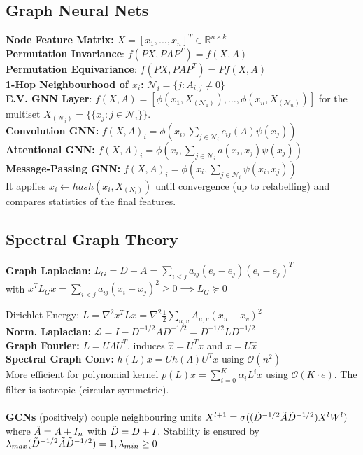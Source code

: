 \subsection*{Graph Neural Nets}
\textbf{Node Feature Matrix:} $X = [x_1, ..., x_n]^T \in \mathbb{R}^{n\times k}$\\
\textbf{Permutation Invariance}: $f(PX, PAP^T) = f(X, A)$\\
\textbf{Permutation Equivariance}: $f(PX, PAP^T) = Pf(X, A)$\\
\textbf{1-Hop Neighbourhood of $x_i$:} $\mathcal{N}_i = \{j: A_{i,j} \not = 0\}$\\
\textbf{E.V. GNN Layer}: $f(X, A) = [\phi(x_1, X_{(\mathcal{N}_1)}), \dots, \phi(x_n, X_{(\mathcal{N}_n)})]$ for the multiset $X_{(\mathcal{N}_i)} = \{\{x_j : j \in \mathcal{N}_i\}\}$.\\
\textbf{Convolution GNN:} $f(X,A)_i = \phi(x_i, \sum_{j \in \mathcal N_i} c_{ij}(A) \psi(x_j))$\\
\textbf{Attentional GNN:} $f(X,A)_i = \phi(x_i, \sum_{j \in \mathcal N_i} a(x_i, x_j) \psi(x_j))$\\
\textbf{Message-Passing GNN:} $f(X,A)_i = \phi(x_i, \sum_{j \in \mathcal N_i} \psi(x_i, x_j))$\\
It applies \(x_i \gets hash(x_i, X_{(N_i)})\) until convergence (up to relabelling) and compares statistics of the final features.

\columnbreak

\subsection*{Spectral Graph Theory}
\textbf{Graph Laplacian:} $L_G=D-A=\sum_{i<j}a_{ij}(e_i-e_j)(e_i-e_j)^T$\\
with $x^TL_Gx=\sum_{i<j}a_{ij}(x_i-x_j)^2 \geq 0 \implies L_G \succeq 0$


Dirichlet Energy: \hfill $L = \nabla^2 x^T L x = \nabla^2 \frac{1}{2} \sum_{u,v} A_{u,v} (x_u - x_v)^2$\\
\textbf{Norm. Laplacian:} $\mathcal L = I - D^{-1/2}A D^{-1/2} = D^{-1/2}LD^{-1/2}$\\
\textbf{Graph Fourier:} $L = U\Lambda U^T$, induces $\hat{x} = U^T x$ and $x = U\hat{x}$\\
\textbf{Spectral Graph Conv:} $h(L)x = Uh(\Lambda) U^T x$ using \(\mathcal O(n^2)\)\\
More efficient for polynomial kernel $p(L)x = \sum_{i=0}^K \alpha_i L^i x$ using \(\mathcal{O}(K \cdot e)\). The filter is isotropic (circular symmetric).\\
\\
\textbf{GCNs} (positively) couple neighbouring units $X^{l+1} = \sigma ((\Tilde{D}^{-1/2} \Tilde{A} \Tilde{D}^{-1/2}) X^l W^l)$ where $\Tilde{A} = A + I_n$ with $\Tilde{D} = D + I$. Stability is ensured by $\lambda_{max}(\Tilde{D}^{-1/2} \Tilde{A} \Tilde{D}^{-1/2}) = 1, \lambda_{min}\geq 0$
\color{red}